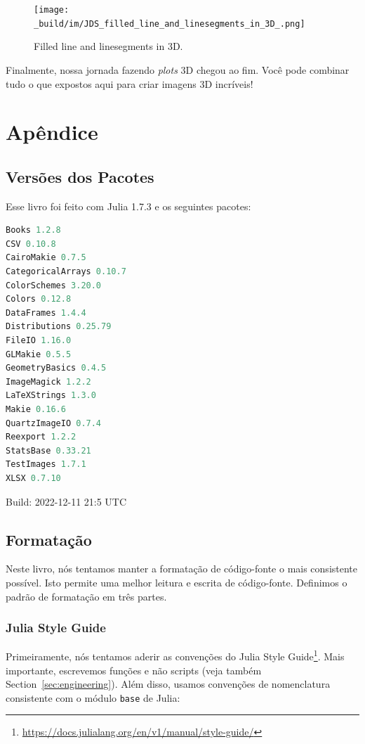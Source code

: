 \documentclass[
  notoc %
]{tufte-book}
\DeclareRobustCommand{\href}[2]{#2\footnote{\url{#1}}}
\newcommand{\passthrough}[1]{#1}
\begin{document}
\begin{figure}
\hypertarget{fig:filled_line_and_linesegments_in_3D}{%
\centering
\texttt{[image: \_build/im/JDS\_filled\_line\_and\_linesegments\_in\_3D\_.png]}
\caption{Filled line and linesegments in
3D.}\label{fig:filled_line_and_linesegments_in_3D}
}
\end{figure}

Finalmente, nossa jornada fazendo \emph{plots} 3D chegou ao fim. Você
pode combinar tudo o que expostos aqui para criar imagens 3D incríveis!

\hypertarget{sec:appendix}{%
\chapter{Apêndice}\label{sec:appendix}}

\hypertarget{sec:appendix_pkg}{%
\section{Versões dos Pacotes}\label{sec:appendix_pkg}}

Esse livro foi feito com Julia 1.7.3 e os seguintes pacotes:

\begin{lstlisting}[language=Julia]
Books 1.2.8
CSV 0.10.8
CairoMakie 0.7.5
CategoricalArrays 0.10.7
ColorSchemes 3.20.0
Colors 0.12.8
DataFrames 1.4.4
Distributions 0.25.79
FileIO 1.16.0
GLMakie 0.5.5
GeometryBasics 0.4.5
ImageMagick 1.2.2
LaTeXStrings 1.3.0
Makie 0.16.6
QuartzImageIO 0.7.4
Reexport 1.2.2
StatsBase 0.33.21
TestImages 1.7.1
XLSX 0.7.10
\end{lstlisting}

Build: 2022-12-11 21:5 UTC

\hypertarget{sec:notation}{%
\section{Formatação}\label{sec:notation}}

Neste livro, nós tentamos manter a formatação de código-fonte o mais
consistente possível. Isto permite uma melhor leitura e escrita de
código-fonte. Definimos o padrão de formatação em três partes.

\hypertarget{julia-style-guide}{%
\subsection{Julia Style Guide}\label{julia-style-guide}}

Primeiramente, nós tentamos aderir as convenções do
\href{https://docs.julialang.org/en/v1/manual/style-guide/}{Julia Style
Guide}. Mais importante, escrevemos funções e não scripts (veja também
Section~\ref{sec:engineering}). Além disso, usamos convenções de
nomenclatura consistente com o módulo \passthrough{\lstinline!base!} de
Julia:
\end{document}
